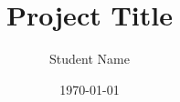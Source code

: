 \documentclass[11pt,a4paper]{sitshonours}
\title{Project Title}
\author{Student Name}
\date{\today}
\begin{document}
\maketitle

\newpage
\thispagestyle{plain}

\newpage
\begin{singlespacing}
	\tableofcontents
\end{singlespacing}
\setlength{\parskip}{1em}
\renewcommand{\baselinestretch}{2.0}

\newpage
{}
\setcounter{page}{1}
\onehalfspacing




\newpage
\singlespacing

\end{document}
